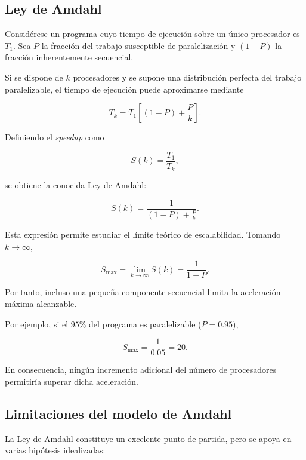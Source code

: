 \documentclass[11pt]{article}
\begin{document}
\subsection{Ley de Amdahl}

Considérese un programa cuyo tiempo de ejecución sobre un único procesador es \(T_1\). Sea \(P\) la fracción del trabajo susceptible de paralelización y \((1-P)\) la fracción inherentemente secuencial.

Si se dispone de \(k\) procesadores y se supone una distribución perfecta del trabajo paralelizable, el tiempo de ejecución puede aproximarse mediante

\begin{equation}
T_k
=
T_1
\left[
(1-P)+\frac{P}{k}
\right].
\end{equation}

Definiendo el \emph{speedup} como

\begin{equation}
S(k)
=
\frac{T_1}{T_k},
\end{equation}

se obtiene la conocida Ley de Amdahl:

\begin{equation}
S(k)
=
\frac{1}
{(1-P)+\frac{P}{k}}.
\label{eq:amdahl_appendix}
\end{equation}

Esta expresión permite estudiar el límite teórico de escalabilidad. Tomando \(k \to \infty\),

\begin{equation}
S_{\max}
=
\lim_{k\to\infty}
S(k)
=
\frac{1}{1-P}.
\end{equation}

Por tanto, incluso una pequeña componente secuencial limita la aceleración máxima alcanzable.

Por ejemplo, si el \(95\%\) del programa es paralelizable (\(P=0.95\)),

\begin{equation}
S_{\max}
=
\frac{1}{0.05}
=
20.
\end{equation}

En consecuencia, ningún incremento adicional del número de procesadores permitiría superar dicha aceleración.

\subsection{Limitaciones del modelo de Amdahl}

La Ley de Amdahl constituye un excelente punto de partida, pero se apoya en varias hipótesis idealizadas:
\end{document}
